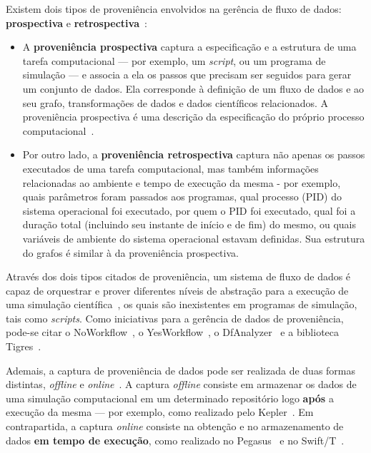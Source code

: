 Existem dois tipos de proveniência envolvidos na gerência de fluxo de dados: \textbf{prospectiva} e \textbf{retrospectiva}~\cite{murta2014noworkflow,freire2008provenance}:

\begin{itemize}
    \item A \textbf{proveniência prospectiva} captura a especificação e a estrutura de uma tarefa computacional --- por exemplo, um \textit{script}, ou um programa de simulação --- e associa a ela os passos que precisam ser seguidos para gerar um conjunto de dados. Ela corresponde à definição de um fluxo de dados e ao seu grafo, transformações de dados e dados científicos relacionados. A proveniência prospectiva é uma descrição da especificação do próprio processo computacional~\cite{mcphillips2015yesworkflow}.
    \item Por outro lado, a \textbf{proveniência retrospectiva} captura não apenas os passos executados de uma tarefa computacional, mas também informações relacionadas ao ambiente e tempo de execução da mesma - por exemplo, quais parâmetros foram passados aos programas, qual  processo (PID) do sistema operacional foi executado, por quem o PID foi executado, qual foi a duração total (incluindo seu instante de início e de fim) do mesmo, ou quais variáveis de ambiente do sistema operacional estavam definidas. Sua estrutura do grafos é similar à da proveniência prospectiva.
\end{itemize}

Através dos dois tipos citados de proveniência, um sistema de fluxo de dados é capaz de orquestrar e prover diferentes níveis de abstração para a execução de uma simulação científica~\cite{murta2014noworkflow}, os quais são inexistentes em programas de simulação, tais como \textit{scripts}. Como iniciativas para a gerência de dados de proveniência, pode-se citar o NoWorkflow~\cite{murta2014noworkflow}, o YesWorkflow~\cite{mcphillips2015yesworkflow}, o DfAnalyzer~\cite{silva2016situ} e a biblioteca Tigres~\cite{hendrix2016tigres}.

Ademais, a captura de proveniência de dados pode ser realizada de duas formas distintas, \textit{offline} e \textit{online}~\cite{silva2015propostadoutorado}. A captura \textit{offline} consiste em armazenar os dados de uma simulação computacional em um determinado repositório logo \textbf{após} a execução da mesma --- por exemplo, como realizado pelo Kepler~\cite{ludascher2006scientific}. Em contrapartida, a captura \textit{online} consiste na obtenção e no armazenamento de dados \textbf{em tempo de execução}, como realizado no Pegasus~\cite{deelman2005pegasus} e no Swift/T~\cite{zhao2007swift}.

